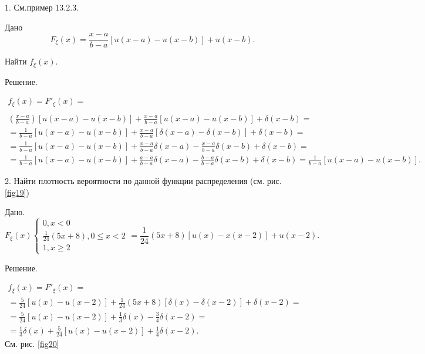 \begin{example}
	1. См.пример 13.2.3. 

	Дано
	\begin{equation}
		F_{\xi}(x)=\frac{x-a}{b-a}[u(x-a)-u(x-b)]+u(x-b).
	\end{equation}

	Найти $f_{\xi}(x)$.

	Решение.

	\begin{gather*}
		f_{\xi}(x)=F'_{\xi}(x)=\\
		\\\left(\frac{x-a}{b-a}\right)[u(x-a)-u(x-b)]+\frac{x-a}{b-a}
		[u(x-a)-u(x-b)]+\delta(x-b)=\\
		=\frac{1}{b-a}[u(x-a)-u(x-b)]+\frac{x-a}{b-a}[\delta(x-a)-\delta(x-b)]+\delta(x-b)=\\=
		\frac{1}{b-a}[u(x-a)-u(x-b)]+\frac{x-a}{b-a}\delta(x-a)
		-\frac{x-a}{b-a}\delta(x-b)+\delta(x-b)=\\=
		\frac{1}{b-a}[u(x-a)-u(x-b)]+\frac{a-a}{b-a}\delta(x-a)-\frac{b-a}{b-a}\delta(x-b)+\delta(x-b)=\frac{1}{b-a}[u(x-a)-u(x-b)].
	\end{gather*}

	2. Найти плотность вероятности по данной функции распределения
	(см. рис. \ref{fig19})
	
	Дано.
	\begin{equation*}
		F_{\xi}(x)
		\begin{cases}
			0, x<0 \\
			\frac{1}{24}(5x+8), 0\leqslant x<2 \\
			1, x\geqslant 2
		\end{cases}
		=\frac{1}{24}(5x+8)[u(x)-x(x-2)]+u(x-2).
	\end{equation*}

	Решение.

	\begin{gather*}
		f_{\xi}(x)=F'_{\xi}(x)=\\=
		\frac{5}{24}[u(x)-u(x-2)]+\frac{1}{24}(5x+8)[\delta(x)-\delta(x-2)]+\delta(x-2)=\\=
		\frac{5}{24}[u(x)-u(x-2)]+\frac{1}{3}\delta(x)-\frac{3}{4}\delta(x-2)=\\=
		\frac{1}{3}\delta(x)+\frac{5}{24}[u(x)-u(x-2)]+\frac{1}{4}\delta(x-2).
	\end{gather*}
	См. рис. \ref{fig20}
\end{example}
